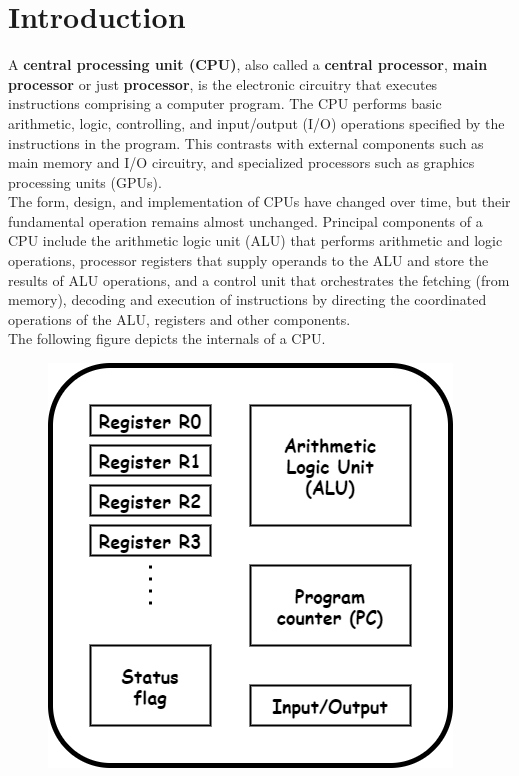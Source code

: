 
\section{Introduction}
A \textbf{central processing unit (CPU)}, also called a \textbf{central processor}, \textbf{main processor} or just \textbf{processor}, is the electronic circuitry that executes instructions comprising a computer program. The CPU performs basic arithmetic, logic, controlling, and input/output (I/O) operations specified by the instructions in the program. This contrasts with external components such as main memory and I/O circuitry, and specialized processors such as graphics processing units (GPUs).\bigskip\\
The form, design, and implementation of CPUs have changed over time, but their fundamental operation remains almost unchanged. Principal components of a CPU include the arithmetic logic unit (ALU) that performs arithmetic and logic operations, processor registers that supply operands to the ALU and store the results of ALU operations, and a control unit that orchestrates the fetching (from memory), decoding and execution of instructions by directing the coordinated operations of the ALU, registers and other components.\bigskip\\
The following figure depicts the internals of a CPU.\\

\begin{figure}[h]
    \includegraphics[scale = 0.5]{source/picture/Lab09/Processor_Image.png}
    \centering
\end{figure}

